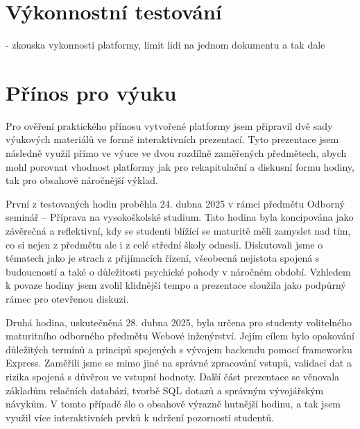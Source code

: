 


\section{Výkonnostní testování}

- zkouska vykonnosti platformy, limit lidi na jednom dokumentu a tak dale

\section{Přínos pro výuku}

Pro ověření praktického přínosu vytvořené platformy jsem připravil dvě sady výukových materiálů ve formě interaktivních prezentací. 
Tyto prezentace jsem následně využil přímo ve výuce ve dvou rozdílně zaměřených předmětech, abych mohl porovnat vhodnost platformy jak pro rekapitulační a diskusní formu hodiny, tak pro obsahově náročnější výklad.

První z testovaných hodin proběhla 24. dubna 2025 v rámci předmětu Odborný seminář -- Příprava na vysokoškolské studium. 
Tato hodina byla koncipována jako závěrečná a reflektivní, kdy se studenti blížící se maturitě měli zamyslet nad tím, co si nejen z předmětu ale i z celé střední školy odnesli. 
Diskutovali jsme o tématech jako je strach z přijímacích řízení, všeobecná nejistota spojená s budoucností a také o důležitosti psychické pohody v náročném období. 
Vzhledem k povaze hodiny jsem zvolil klidnější tempo a prezentace sloužila jako podpůrný rámec pro otevřenou diskuzi.

Druhá hodina, uskutečněná 28. dubna 2025, byla určena pro studenty volitelného maturitního odborného předmětu Webové inženýrství. 
Jejím cílem bylo opakování důležitých termínů a principů spojených s vývojem backendu pomocí frameworku Express. 
Zaměřili jsme se mimo jiné na správné zpracování vstupů, validaci dat a rizika spojená s důvěrou ve vstupní hodnoty. 
Další část prezentace se věnovala základům relačních databází, tvorbě SQL dotazů a správným vývojářským návykům. 
V tomto případě šlo o obsahově výrazně hutnější hodinu, a tak jsem využil více interaktivních prvků k udržení pozornosti studentů.

